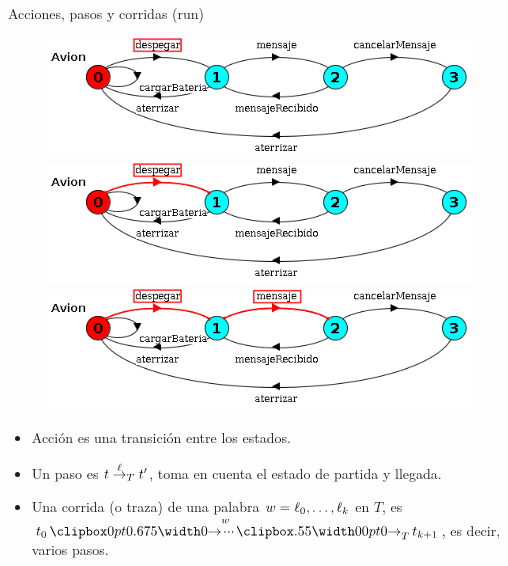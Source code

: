 \begin{frame}{Acciones, pasos y corridas (run)}
    \begin{figure}
        \begin{overprint}
        \includegraphics[width=\textwidth]{figures/1accion.png} 
        \includegraphics[width=\textwidth]{figures/2paso.png} 
        \includegraphics[width=\textwidth]{figures/3run.png} 
        \end{overprint}
    \end{figure}

    \begin{itemize}
     \item Acción es una transición entre los estados.
     \pause
     \item Un paso es $t \overset{\ell}{\rightarrow}_{T} t'$, toma en cuenta el estado de partida y llegada.
     \pause
     \item Una corrida (o traza) de una palabra $w = \ell_0,\ldots,\ell_k$ en $T$, es $t_0 \runw{w}{T} t_{k+1}$, es decir, varios pasos.
    \end{itemize}
    
\end{frame}
